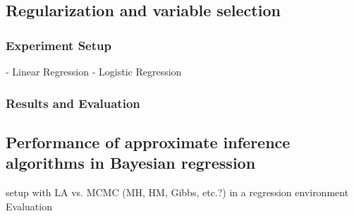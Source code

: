 \subsection{Regularization and variable selection}



\subsubsection*{Experiment Setup}

- Linear Regression
- Logistic Regression

\subsubsection*{Results and Evaluation}

\subsection{Performance of approximate inference algorithms in Bayesian regression}

setup with LA vs. MCMC (MH, HM, Gibbs, etc.?) in a regression environment
Evaluation